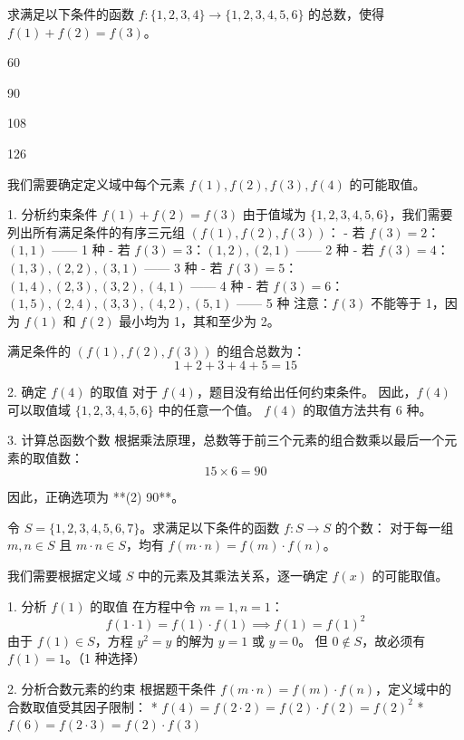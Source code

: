 \begin{questions}
\question 
求满足以下条件的函数 $f : \{1, 2, 3, 4\} \to \{1, 2, 3, 4, 5, 6\}$ 的总数，使得 $f(1) + f(2) = f(3)$。
\begin{choices}
    \item 60
    \item 90
    \item 108
    \item 126
\end{choices}

\begin{solution}
我们需要确定定义域中每个元素 $f(1), f(2), f(3), f(4)$ 的可能取值。

1. 分析约束条件 $f(1) + f(2) = f(3)$
由于值域为 $\{1, 2, 3, 4, 5, 6\}$，我们需要列出所有满足条件的有序三元组 $(f(1), f(2), f(3))$：
- 若 $f(3) = 2$：$(1, 1)$ —— 1 种
- 若 $f(3) = 3$：$(1, 2), (2, 1)$ —— 2 种
- 若 $f(3) = 4$：$(1, 3), (2, 2), (3, 1)$ —— 3 种
- 若 $f(3) = 5$：$(1, 4), (2, 3), (3, 2), (4, 1)$ —— 4 种
- 若 $f(3) = 6$：$(1, 5), (2, 4), (3, 3), (4, 2), (5, 1)$ —— 5 种
注意：$f(3)$ 不能等于 1，因为 $f(1)$ 和 $f(2)$ 最小均为 1，其和至少为 2。

满足条件的 $(f(1), f(2), f(3))$ 的组合总数为：
\[ 1 + 2 + 3 + 4 + 5 = 15 \]

2. 确定 $f(4)$ 的取值
对于 $f(4)$，题目没有给出任何约束条件。
因此，$f(4)$ 可以取值域 $\{1, 2, 3, 4, 5, 6\}$ 中的任意一个值。
$f(4)$ 的取值方法共有 6 种。

3. 计算总函数个数
根据乘法原理，总数等于前三个元素的组合数乘以最后一个元素的取值数：
\[ 15 \times 6 = 90 \]

因此，正确选项为 **(2) 90**。
\end{solution}

\question 
令 $S = \{1, 2, 3, 4, 5, 6, 7\}$。求满足以下条件的函数 $f : S \to S$ 的个数：
对于每一组 $m, n \in S$ 且 $m \cdot n \in S$，均有 $f(m \cdot n) = f(m) \cdot f(n)$。

\begin{solution}
我们需要根据定义域 $S$ 中的元素及其乘法关系，逐一确定 $f(x)$ 的可能取值。

1. 分析 $f(1)$ 的取值
在方程中令 $m=1, n=1$：
\[ f(1 \cdot 1) = f(1) \cdot f(1) \implies f(1) = f(1)^2 \]
由于 $f(1) \in S$，方程 $y^2 = y$ 的解为 $y=1$ 或 $y=0$。
但 $0 \notin S$，故必须有 $f(1) = 1$。（1 种选择）

2. 分析合数元素的约束
根据题干条件 $f(m \cdot n) = f(m) \cdot f(n)$，定义域中的合数取值受其因子限制：
* $f(4) = f(2 \cdot 2) = f(2) \cdot f(2) = f(2)^2$
* $f(6) = f(2 \cdot 3) = f(2) \cdot f(3)$


\end{solution}
\end{questions}
